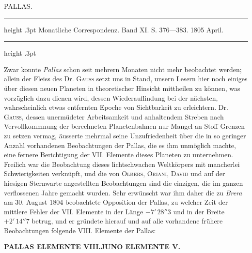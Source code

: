 \par\bigskip
{}
\hypertarget{native-267-lower}{}
\begin{center}
\large PALLAS.
\end{center}

\begin{center}
\parbox{.73\linewidth}{%
\centering\fontsize{8.2}{10.2}\selectfont
\hrule height .3pt\relax\vspace{2.5pt}
Monatliche Correspondenz. Band XI. S. 376—383. 1805 April.\par
\vspace{2.5pt}\hrule height .3pt\relax
}
\end{center}

\par\indent Zwar konnte \emph{Pallas} schon seit mehrern Monaten nicht mehr beobachtet werden; allein der Fleiss
des Dr. \textsc{Gauss} setzt uns in Stand, unsern Lesern hier noch einiges über diesen neuen Planeten in theoretischer
Hinsicht mittheilen zu können, was vorzüglich dazu dienen wird, dessen Wiederauffindung bei
der nächsten, wahrscheinlich etwas entfernten Epoche von Sichtbarkeit zu erleichtern. Dr. \textsc{Gauss}, dessen
unermüdeter Arbeitsamkeit und anhaltendem Streben nach Vervollkommnung der berechneten Planetenbahnen
nur Mangel an Stoff Grenzen zu setzen vermag, äusserte mehrmal seine Unzufriedenheit
über die in so geringer Anzahl vorhandenen Beobachtungen der Pallas, die es ihm unmöglich machte,
eine fernere Berichtigung der VII. Elemente dieses Planeten zu unternehmen. Freilich war die Beobachtung
dieses lichtschwachen Weltkörpers mit mancherlei Schwierigkeiten verknüpft, und die von \textsc{Olbers},
\textsc{Oriani}, \textsc{David} und auf der hiesigen Sternwarte angestellten Beobachtungen sind die einzigen, die
im ganzen verflossenen Jahre gemacht wurden. Sehr erwünscht war ihm daher die zu \emph{Brera} am 30.
August 1804 beobachtete Opposition der Pallas, zu welcher Zeit der mittlere Fehler der VII. Elemente
in der Länge $-7'\,28''3$ und in der Breite $+2'\,14''7$ betrug, und er gründete hierauf und auf alle vorhandene
frühere Beobachtungen folgende VIII. Elemente der Pallas:
\par
\clearpage
\thispagestyle{empty}
\noindent{}%
\makebox[12mm][l]{}%
\parbox[t]{\dimexpr\linewidth-24mm\relax}{\centering\footnotesize\bfseries PALLAS ELEMENTE VIII.\enspace JUNO ELEMENTE V.\par}%
\par\nobreak\medskip
